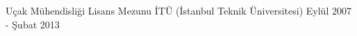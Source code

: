 \begin{cventries}
  \cventry
    {Uçak Mühendisliği Lisans Mezunu}
    {İTÜ (İstanbul Teknik Üniversitesi)}
    {Eylül 2007 - Şubat 2013}
    {}
    {
      \begin{cvitems}
      \end{cvitems}
    }
\end{cventries}
